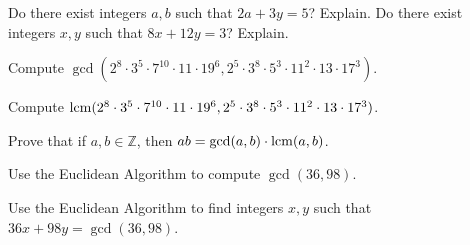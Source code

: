 \documentclass[11pt,letterpaper]{article}
\begin{document}
\homework{}

 Do there exist integers $a, b$ such that $2a + 3y= 5$? Explain. Do there exist integers $x, y$ such that $8x + 12y= 3$? Explain. \pspace





\newpage





 Compute $\gcd(2^8 \cdot 3^5 \cdot 7^{10} \cdot 11 \cdot 19^6, 2^5 \cdot 3^8 \cdot 5^3 \cdot 11^2 \cdot 13 \cdot 17^3)$. \pspace





\newpage





 Compute $\operatorname{lcm}(2^8 \cdot 3^5 \cdot 7^{10} \cdot 11 \cdot 19^6, 2^5 \cdot 3^8 \cdot 5^3 \cdot 11^2 \cdot 13 \cdot 17^3)$. \pspace





\newpage





 Prove that if $a, b \in \mathbb{Z}$, then $ab= \gcd(a, b) \cdot \operatorname{lcm}(a, b)$. \pspace





\newpage





 Use the Euclidean Algorithm to compute $\gcd(36, 98)$. \pspace





\newpage





 Use the Euclidean Algorithm to find integers $x, y$ such that $36x + 98y= \gcd(36, 98)$. \pspace
\end{document}
